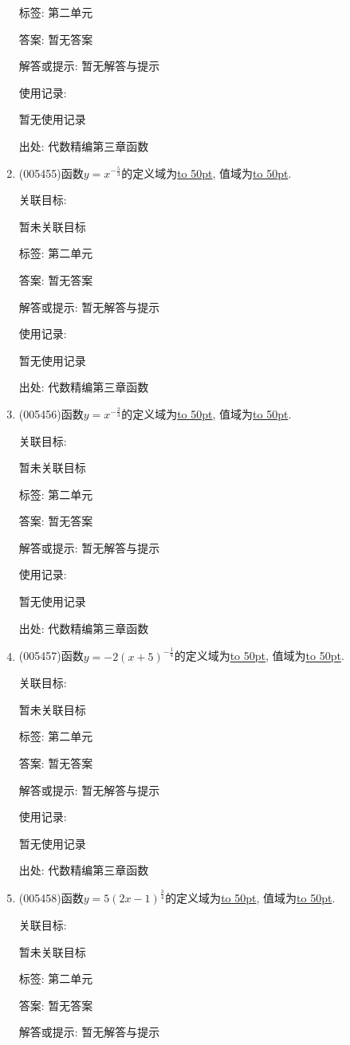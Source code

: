 \documentclass[10pt,a4paper]{article}
\newcommand{\blank}[1]{\underline{\hbox to #1pt{}}}
\begin{document}
\begin{enumerate}[1.]
标签: 第二单元

答案: 暂无答案

解答或提示: 暂无解答与提示

使用记录:

暂无使用记录


出处: 代数精编第三章函数
\item { (005455)}函数$y=x^{-\frac 53}$的定义域为\blank{50}, 值域为\blank{50}.


关联目标:

暂未关联目标



标签: 第二单元

答案: 暂无答案

解答或提示: 暂无解答与提示

使用记录:

暂无使用记录


出处: 代数精编第三章函数
\item { (005456)}函数$y=x^{-\frac 23}$的定义域为\blank{50}, 值域为\blank{50}.


关联目标:

暂未关联目标



标签: 第二单元

答案: 暂无答案

解答或提示: 暂无解答与提示

使用记录:

暂无使用记录


出处: 代数精编第三章函数
\item { (005457)}函数$y=-2(x+5)^{-\frac 14}$的定义域为\blank{50}, 值域为\blank{50}.


关联目标:

暂未关联目标



标签: 第二单元

答案: 暂无答案

解答或提示: 暂无解答与提示

使用记录:

暂无使用记录


出处: 代数精编第三章函数
\item { (005458)}函数$y=5(2x-1)^{\frac 34}$的定义域为\blank{50}, 值域为\blank{50}.


关联目标:

暂未关联目标



标签: 第二单元

答案: 暂无答案

解答或提示: 暂无解答与提示


\end{enumerate}
\end{document}
